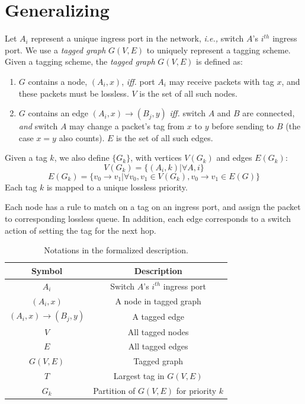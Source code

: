 \section{Generalizing \sysname{}}
\label{sec:generic}


Let $A_i$ represent a unique ingress port in the network, {\em i.e.,} switch
$A$'s $i^{th}$ ingress port.  We use a {\em tagged graph} $G(V,E)$ to uniquely
represent a tagging scheme.  Given a tagging scheme, the {\em tagged graph}
$G(V,E)$ is defined as:

\begin{enumerate}
\item $G$ contains a node, $(A_i, x)$, {\em iff.} port $A_i$ may receive packets with tag $x$, and these packets must
be lossless. $V$ is the set of all such nodes.

\item $G$ contains an edge $(A_i, x)\rightarrow(B_j, y)$ {\em iff.} switch $A$ and $B$ are
connected, {\em and} switch $A$ may change a packet's tag from $x$ to $y$ before sending to $B$ (the case $x=y$ also counts).
$E$ is the set of all such edges.

\end{enumerate}

Given a tag $k$, we also define $\{G_k\}$, with vertices $V(G_k)$ and edges
$E(G_k)$:
$$V(G_k) = \{(A_i, k) | \forall A, i\} $$
$$E(G_k) = \{v_0 \rightarrow v_1 | \forall v_0, v_1 \in V(G_k),  v_0 \rightarrow v_1 \in E(G)\} $$
Each tag $k$ is mapped to a unique lossless priority.

Each node has a rule to match on a tag on an ingress port, and assign the packet
to corresponding lossless queue.  In addition, each edge corresponds to a switch
action of setting the tag for the next hop.

\begin{table}[t]
\footnotesize
\centering
\begin{tabular}{|c|c|}
\hline
Symbol & Description \\ \hline
$A_i$ & Switch $A$'s $i^{th}$ ingress port  \\ \hline
$(A_i, x)$ & A node in tagged graph \\ \hline
$(A_i, x)\rightarrow(B_j, y)$ & A tagged edge \\ \hline
$V$ & All tagged nodes  \\ \hline
$E$ & All tagged edges \\ \hline
$G(V, E)$ & Tagged graph \\ \hline
$T$ & Largest tag in $G(V,E)$ \\ \hline
$G_k$ & Partition of $G(V,E)$ for priority $k$ \\ \hline
\end{tabular}
\caption{Notations in the formalized description.}
\label{tab:symbols}
		\vspace{-1.5em}
\end{table}



